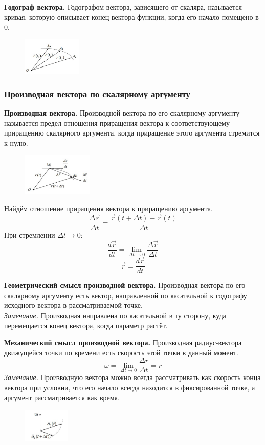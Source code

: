 \documentclass{article}
\begin{document}
  \textbf{Годограф вектора.} Годографом вектора, зависящего от скаляра, называется кривая, которую описывает конец вектора-функции, когда его начало помещено в 0.
  \begin{figure}[H]
      \centering
    \includegraphics[width=0.25\textwidth]{image2_4.png}
  \end{figure}

  \subsubsection{Производная вектора по скалярному аргументу}

  \par\textbf{Производная вектора.} Производной вектора по его скалярному аргументу называется предел отношения приращения вектора к соответствующему приращению скалярного аргумента, когда приращение этого аргумента стремится к нулю.\\
  \begin{figure}[H]
      \centering
    \includegraphics[width=0.3\textwidth]{image2_5.png}
  \end{figure}
  Найдём отношение приращения вектора к приращению аргумента.
  $$\frac {\Delta \vec{r}} {\Delta t} = \frac{\vec{r}(t+\Delta t) - \vec{r}(t)}{\Delta t}$$
  При стремлении $\Delta t \rightarrow 0$:
  $$\frac{d\vec{r}}{dt} = \lim_{\Delta t \rightarrow 0} \frac{\Delta \vec{r}}{\Delta t}$$
  $$\dot{\vec{r}} = \frac{d\vec{r}}{dt}$$
  \par\textbf{Геометрический смысл производной вектора.} Производная вектора по его скалярному аргументу есть вектор, направленной по касательной к годографу исходного вектора в рассматриваемой точке.\\
  \textit{Замечание.} Производная направлена по касательной в ту сторону, куда перемещается конец вектора, когда параметр растёт.
  \par\textbf{Механический смысл производной вектора.} Производная радиус-вектора движущейся точки по времени есть скорость этой точки в данный момент.
  $$\omega = \lim_{\Delta t \rightarrow 0} \frac{\Delta r}{\Delta t} = \dot{r}$$
  \textit{Замечание.} Производную вектора можно всегда рассматривать как скорость конца вектора при условии, что его начало всегда находится в фиксированной точке, а аргумент рассматривается как время.
  \begin{figure}[H]
      \centering
    \includegraphics[width=0.2\textwidth]{image2_2.png}
  \end{figure}
\end{document}
